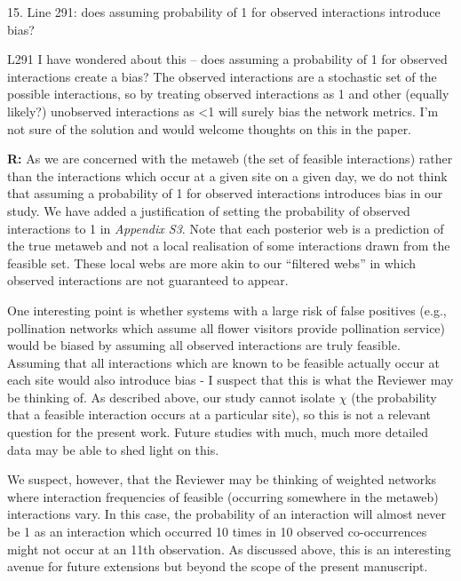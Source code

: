 \documentclass[12pt]{letter}
\newenvironment{refquote}{\bigskip \begin{it}}{\end{it}\smallskip}
\begin{document}
	15. Line 291: does assuming probability of 1 for observed interactions introduce bias?


		\begin{refquote}
		L291 I have wondered about this – does assuming a probability of 1 for observed interactions create a bias? The observed interactions are a stochastic set of the possible interactions, so by treating observed interactions as 1 and other (equally likely?) unobserved interactions as \textless1 will surely bias the network metrics. I'm not sure of the solution and would welcome thoughts on this in the paper.
		\end{refquote}


		\textbf{R:} As we are concerned with the metaweb (the set of feasible interactions) rather than the interactions which occur at a given site on a given day, we do not think that assuming a probability of 1 for observed interactions introduces bias in our study. We have added a justification of setting the probability of observed interactions to 1 in \emph{Appendix S3}. Note that each posterior web is a prediction of the true metaweb and not a local realisation of some interactions drawn from the feasible set. These local webs are more akin to our ``filtered webs'' in which observed interactions are not guaranteed to appear. 


		One interesting point is whether systems with a large risk of false positives (e.g., pollination networks which assume all flower visitors provide pollination service) would be biased by assuming all observed interactions are truly feasible. Assuming that all interactions which are known to be feasible actually occur at each site would also introduce bias - I suspect that this is what the Reviewer may be thinking of. As described above, our study cannot isolate $\chi$ (the probability that a feasible interaction occurs at a particular site), so this is not a relevant question for the present work. Future studies with much, much more detailed data may be able to shed light on this.


		We suspect, however, that the Reviewer may be thinking of weighted networks where interaction frequencies of feasible (occurring somewhere in the metaweb) interactions vary. In this case, the probability of an interaction will almost never be 1 as an interaction which occurred 10 times in 10 observed co-occurrences might not occur at an 11th observation. As discussed above, this is an interesting avenue for future extensions but beyond the scope of the present manuscript.
\end{document}
